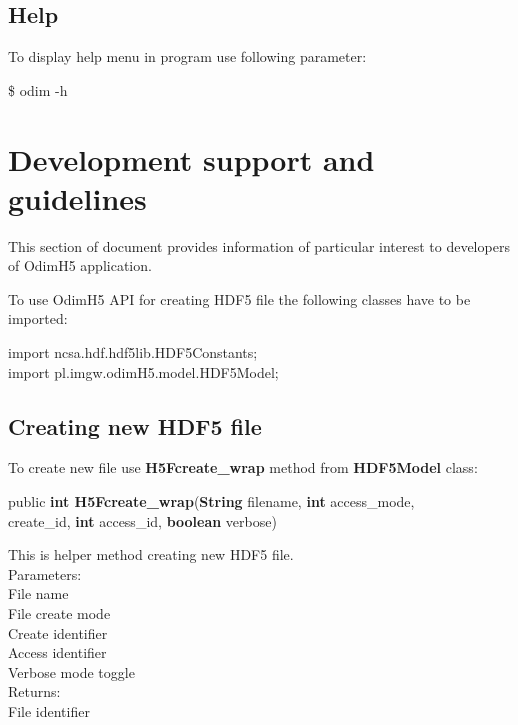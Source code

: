 \documentclass[11p]{article}
\begin{document}
\subsection{Help}

To display help menu in program use following parameter:
\begin{kod}
\$ odim -h
\end{kod}

\section{Development support and guidelines}

This section of document provides information of particular interest to
developers of OdimH5 application.

To use OdimH5 API for creating HDF5 file the following classes have to be
imported:
\begin{kod}
import ncsa.hdf.hdf5lib.HDF5Constants;\\
import pl.imgw.odimH5.model.HDF5Model;
\end{kod}

\subsection{Creating new HDF5 file}

To create new file use {\bf H5Fcreate\_wrap} method from {\bf HDF5Model} class:
\begin{kod}
public {\bf int H5Fcreate\_wrap}({\bf String} filename, {\bf int}
access\_mode,\\ \hspace*{0.5cm}{\bf int} create\_id, {\bf int} access\_id, {\bf boolean}
verbose)
\end{kod}
This is helper method creating new HDF5 file.\\
Parameters:\\
\hspace*{0.5cm}{\bf filename} File name\\
\hspace*{0.5cm}{\bf access\_mode} File create mode\\
\hspace*{0.5cm}{\bf create\_id} Create identifier\\
\hspace*{0.5cm}{\bf access\_id} Access identifier\\
\hspace*{0.5cm}{\bf verbose} Verbose mode toggle\\
Returns:\\
\hspace*{0.5cm}File identifier\\
\end{document}
